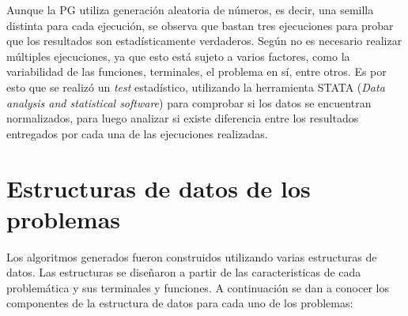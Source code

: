 Aunque la PG utiliza generación aleatoria de números, es decir, una semilla distinta para cada ejecución, se observa que bastan tres ejecuciones para probar que los resultados son estadísticamente verdaderos. Según \cite{cantu_2003, li_2004} no es necesario realizar múltiples ejecuciones, ya que esto está sujeto a varios factores, como la variabilidad de las funciones, terminales, el problema en sí,  entre otros. Es por esto que se realizó un \textit{test} estadístico, utilizando la herramienta STATA (\textit{Data analysis and statistical software}) para comprobar si los datos se encuentran normalizados, para luego analizar si existe diferencia entre los resultados entregados por cada una de las ejecuciones realizadas. 



\section{Estructuras de datos de los problemas}

Los algoritmos generados fueron construidos utilizando varias estructuras de datos. Las estructuras se diseñaron a partir de las caracteristicas de cada problemática y sus terminales y funciones. A continuación se dan a conocer los componentes de la estructura de datos para cada uno de los problemas:
 

